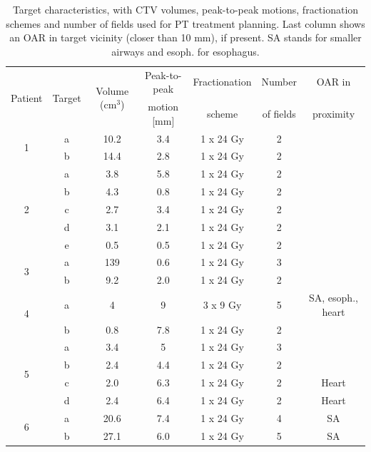 \documentclass[type=dr, dr=rernat, accentcolor=tud7b,colorbacktitle, bigchapter, openright, twoside, 12pt ]{tudthesis}
\begin{document}
\begin{table}[H]
	\centering
	\caption{Target characteristics, with CTV volumes, peak-to-peak motions, fractionation schemes and number of fields used for PT treatment planning. Last column 
	shows an OAR in target vicinity (closer than 10 mm), if present. SA stands for smaller airways and esoph. for esophagus.}
	\begin{tabular}{c|c|c|c|c|c|c}
		\hline\hline
		\multirow{2}{*}{Patient} & \multirow{2}{*}{Target} & \multirow{2}{*}{Volume (cm$^3$)} & Peak-to-peak & Fractionation & Number & OAR in \\
		 & & & motion [mm] & scheme & of fields & proximity \\
		\hline
		\multirow{2}{*}{1} & a & 10.2 & 3.4  & 1 x 24 Gy & 2 & \\
		 & b & 14.4 & 2.8 & 1 x 24 Gy  & 2 &  \\

		 
		 \hline
		 \multirow{5}{*}{2} & a & 3.8 & 5.8  & 1 x 24 Gy & 2 &\\
		  & b & 4.3 & 0.8  & 1 x 24 Gy& 2 &\\
		  & c & 2.7 & 3.4  & 1 x 24 Gy & 2&\\
		  & d & 3.1 & 2.1  & 1 x 24 Gy & 2&\\
		  & e & 0.5 & 0.5  & 1 x 24 Gy & 2&\\
		  \hline
		  \multirow{2}{*}{3} & a & 139 & 0.6 & 1 x 24 Gy & 3 \\
		 & b & 9.2 & 2.0  & 1 x 24 Gy & 2 \\
		 \hline
		 \multirow{2}{*}{4} & a & 4 & 9  & 3 x 9 Gy  & 5 & SA, esoph., heart \\
		 & b & 0.8 & 7.8  & 1 x 24 Gy & 2 \\
		 \hline
		 \multirow{4}{*}{5} & a & 3.4   & 5  & 1 x 24 Gy & 3 &  \\
				    & b & 2.4 & 4.4  & 1 x 24 Gy & 2 &\\
				    & c & 2.0 & 6.3  & 1 x 24 Gy& 2& Heart\\
				    & d & 2.4 & 6.4  & 1 x 24 Gy & 2 & Heart\\
		\hline	    
		\multirow{2}{*}{6} & a & 20.6 & 7.4 & 1 x 24 Gy & 4 & SA  \\
		 & b & 27.1 & 6.0  & 1 x 24 Gy &5 & SA  \\
		 

\end{tabular}
\end{table}
\end{document}
